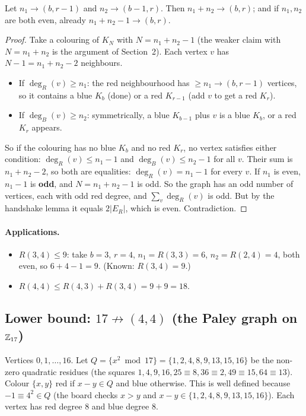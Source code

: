 \documentclass[11pt]{article}
\begin{document}
\begin{lemma}
Let $n_1\to(b,r-1)$ and $n_2\to(b-1,r)$. Then $n_1+n_2\to(b,r)$; and if $n_1,n_2$ are both even, already $n_1+n_2-1\to(b,r)$.
\end{lemma}
\begin{proof}
Take a colouring of $K_N$ with $N=n_1+n_2-1$ (the weaker claim with $N=n_1+n_2$ is the argument of Section~2). Each vertex $v$ has $N-1=n_1+n_2-2$ neighbours.
\begin{itemize}[nosep]
  \item If $\deg_R(v)\ge n_1$: the red neighbourhood has $\ge n_1\to(b,r-1)$ vertices, so it contains a blue $K_b$ (done) or a red $K_{r-1}$ (add $v$ to get a red $K_r$).
  \item If $\deg_B(v)\ge n_2$: symmetrically, a blue $K_{b-1}$ plus $v$ is a blue $K_b$, or a red $K_r$ appears.
\end{itemize}
So if the colouring has no blue $K_b$ and no red $K_r$, no vertex satisfies either condition: $\deg_R(v)\le n_1-1$ and $\deg_B(v)\le n_2-1$ for all $v$. Their sum is $n_1+n_2-2$, so both are equalities: $\deg_R(v)=n_1-1$ for every $v$. If $n_1$ is even, $n_1-1$ is \textbf{odd}, and $N=n_1+n_2-1$ is odd. So the graph has an odd number of vertices, each with odd red degree, and $\sum_v\deg_R(v)$ is odd. But by the handshake lemma it equals $2|E_R|$, which is even. Contradiction.
\end{proof}

\paragraph{Applications.}
\begin{itemize}[nosep]
  \item $R(3,4)\le9$: take $b=3$, $r=4$, $n_1=R(3,3)=6$, $n_2=R(2,4)=4$, both even, so $6+4-1=9$. (Known: $R(3,4)=9$.)
  \item $R(4,4)\le R(4,3)+R(3,4)=9+9=18$.
\end{itemize}

\subsection{Lower bound: $17\not\to(4,4)$ (the Paley graph on $\mathbb{Z}_{17}$)}

Vertices $0,1,\dots,16$. Let $Q=\{x^2\bmod17\}=\{1,2,4,8,9,13,15,16\}$ be the non-zero quadratic residues (the squares $1,4,9,16,25\equiv8,36\equiv2,49\equiv15,64\equiv13$). Colour $\{x,y\}$ red if $x-y\in Q$ and blue otherwise. This is well defined because $-1\equiv4^2\in Q$ (the board checks $x>y$ and $x-y\in\{1,2,4,8,9,13,15,16\}$). Each vertex has red degree $8$ and blue degree $8$.
\end{document}
